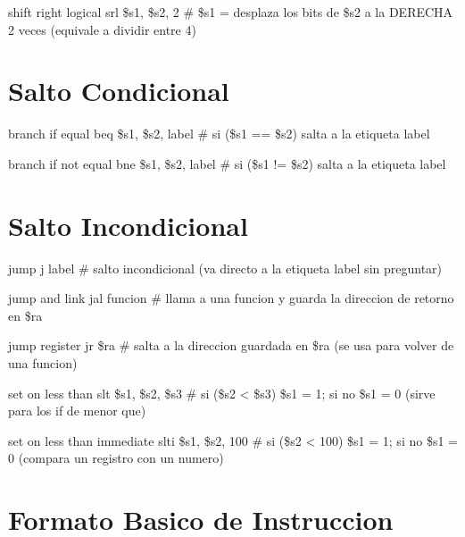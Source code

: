 \documentclass[24pt,letterpaper]{article}
\begin{document}
shift right logical \hspace{0.60cm} srl \$s1, \$s2, 2 \hspace{0.60cm} \# \$s1 = desplaza los bits de \$s2 a la DERECHA 2 veces (equivale a dividir entre 4)

\section{Salto Condicional}
branch if equal \hspace{0.60cm} beq \$s1, \$s2, label \hspace{0.60cm} \# si (\$s1 == \$s2) salta a la etiqueta label

branch if not equal \hspace{0.60cm} bne \$s1, \$s2, label \hspace{0.60cm} \# si (\$s1 != \$s2) salta a la etiqueta label

\section{Salto Incondicional}
jump \hspace{0.60cm} j label \hspace{0.60cm} \# salto incondicional (va directo a la etiqueta label sin preguntar)

jump and link \hspace{0.60cm} jal funcion \hspace{0.60cm} \# llama a una funcion y guarda la direccion de retorno en \$ra

jump register \hspace{0.60cm} jr \$ra \hspace{0.60cm} \# salta a la direccion guardada en \$ra (se usa para volver de una funcion)

set on less than \hspace{0.60cm} slt \$s1, \$s2, \$s3 \hspace{0.60cm} \# si (\$s2 < \$s3) \$s1 = 1; si no \$s1 = 0 (sirve para los if de menor que)

set on less than immediate \hspace{0.60cm} slti \$s1, \$s2, 100 \hspace{0.60cm} \# si (\$s2 < 100) \$s1 = 1; si no \$s1 = 0 (compara un registro con un numero)

\section{Formato Basico de Instruccion}
\vspace{0.4cm}
\end{document}
